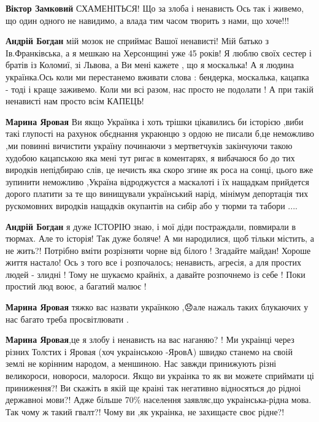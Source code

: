 \begin{itemize}
\begin{itemize}
\textbf{Віктор Замковий} СХАМЕНІТЬСЯ! Що за злоба і ненависть Ось так і живемо,
що один одного не навидимо, а влада тим часом творить з нами, що хоче!!!

\textbf{Андрій Богдан} мій мозок не сприймає Вашої ненависті! Мій батько з
Ів.Франківська, а я мешкаю на Херсонщині уже 45 років! Я люблю своїх сестер і
братів із Коломиї, зі Львова, а Ви мені кажете , що я москалька! А я людина
українка.Ось коли ми перестанемо вживати слова : бендерка, москалька, кацапка -
тоді і краще заживемо. Коли ми всі разом, нас просто не подолати ! А при такій
ненависті нам просто всім КАПЕЦЬ!

\textbf{Марина Яровая} Ви якщо Українка і хоть трішки цікавились би історією
,виби такі глупості на рахунок обєднання украюнцю з ордою не писали б,це
неможливо ,ми повинні вичистити україну починаючи з мертветчуків закінчуючи
такою худобою кацапською яка мені тут ригає в коментарях, я вибачаюся бо до тих
виродків непідбираю слів, це нечисть яка скоро згине як роса на сонці, цього
вже зупинити неможливо ,Україна відроджуєтся а маскалоті і їх нащадкам
прийдется дорого платити за те що винищували український нарід, мінімум
депортація тих рускомовних виродків нащадків окупантів на сибір або у тюрми та
табори ....


\textbf{Андрій Богдан} я дуже ІСТОРІЮ знаю, і мої діди постраждали, повмирали в
тюрмах. Але то історія! Так дуже боляче! А ми народилися, щоб тільки містить, а
не жить?! Потрібно вміти розрізняти чорне від білого ! Згадайте майдан! Хороше
життя настало! Ось з того все і розпочалось; ненависть, агресія, а для простих
людей - злидні ! Тому не шукаємо крайніх, а давайте розпочнемо із себе ! Поки
простий люд воює, а багатий малює !

\textbf{Марина Яровая} тяжко вас назвати українкою ,😞але нажаль таких блукаючих у нас багато треба просвітлювати .


\textbf{Марина Яровая},це я злобу і ненависть на вас наганяю? ! Ми украінці
через різних Толстих і Яровая (хоч украінською -ЯровА) швидко станемо на своій
землі не корінним народом, а меншиною. Нас завжди принижують різні великороси,
новороси, малороси. Якщо ви украінка то як ви можете сприймати ці приниження?!
Ви скажіть в якій ще краіні так негативно відносяться до рідноі державноі
мови?! Адже більше 70\% населення заявляє,що украінська-рідна мова. Так чому ж
такий гвалт?! Чому ви ,як украінка, не захищаєте своє рідне?!


\end{itemize}
\end{itemize}
